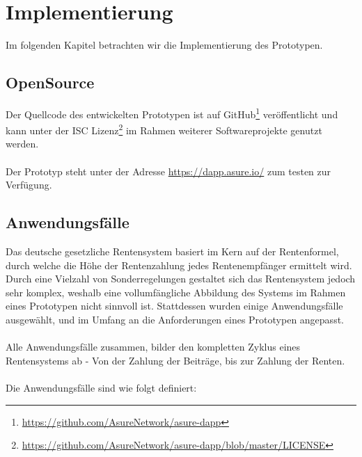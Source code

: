 \section{Implementierung}
Im folgenden Kapitel betrachten wir die Implementierung des Prototypen.


\subsection{OpenSource}
Der Quellcode des entwickelten Prototypen ist auf GitHub\footnote{\url{https://github.com/AsureNetwork/asure-dapp}} veröffentlicht und kann unter der ISC Lizenz\footnote{\url{https://github.com/AsureNetwork/asure-dapp/blob/master/LICENSE}} im Rahmen weiterer Softwareprojekte genutzt werden.

\paragraph*{}
Der Prototyp steht unter der Adresse \url{https://dapp.asure.io/} zum testen zur Verfügung. 

\subsection{Anwendungsfälle}
Das deutsche gesetzliche Rentensystem basiert im Kern auf der Rentenformel, durch welche die Höhe der Rentenzahlung jedes Rentenempfänger ermittelt wird. Durch eine Vielzahl von Sonderregelungen gestaltet sich das Rentensystem jedoch sehr komplex, weshalb eine vollumfängliche Abbildung des Systems im Rahmen eines Prototypen nicht sinnvoll ist. Stattdessen wurden einige Anwendungsfälle ausgewählt, und im Umfang an die Anforderungen eines Prototypen angepasst.

\paragraph{}
Alle Anwendungsfälle zusammen, bilder den kompletten Zyklus eines Rentensystems ab - Von der Zahlung der Beiträge, bis zur Zahlung der Renten.

\paragraph{}
Die Anwendungsfälle sind wie folgt definiert:

